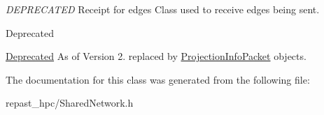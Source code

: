 {\itshape D\-E\-P\-R\-E\-C\-A\-T\-E\-D} Receipt for edges Class used to receive edges being sent. 

\begin{DoxyRefDesc}{Deprecated}
\item[\hyperlink{deprecated__deprecated000004}{Deprecated}]As of Version 2. replaced by \hyperlink{classrepast_1_1_projection_info_packet}{Projection\-Info\-Packet} objects. \end{DoxyRefDesc}


The documentation for this class was generated from the following file\-:\begin{DoxyCompactItemize}
\item 
repast\-\_\-hpc/Shared\-Network.\-h\end{DoxyCompactItemize}
